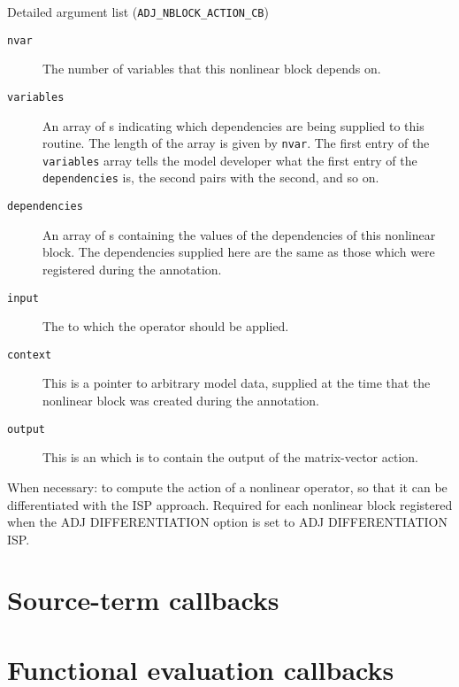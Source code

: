 \begin{boxwithtitle}{Detailed argument list (\texttt{ADJ_NBLOCK_ACTION_CB})}
\begin{description}
\item[\texttt{nvar}] The number of variables that this nonlinear block depends on.
\item[\texttt{variables}] An array of s indicating which dependencies are being supplied to this routine. The length of the
array is given by \texttt{nvar}. The first entry of the \texttt{variables} array
tells the model developer what the first entry of the \texttt{dependencies} is, the second pairs with the second, and so on.
\item[\texttt{dependencies}] An array of s containing the values of the dependencies of this nonlinear block. The dependencies supplied
here are the same as those which were registered during the annotation.
\item[\texttt{input}] The  to which the operator should be applied.
\item[\texttt{context}] This is a pointer to arbitrary model data, supplied at the time that the nonlinear block was created during the annotation.
\item[\texttt{output}] This is an  which is to contain the output of the matrix-vector action.
\end{description}
\end{boxwithtitle}

When necessary: 
to compute the action of a nonlinear operator, so that it can be differentiated
with the ISP approach.
Required for each nonlinear block registered when the ADJ DIFFERENTIATION option is set to ADJ DIFFERENTIATION ISP.


\section{Source-term callbacks}

\section{Functional evaluation callbacks}
